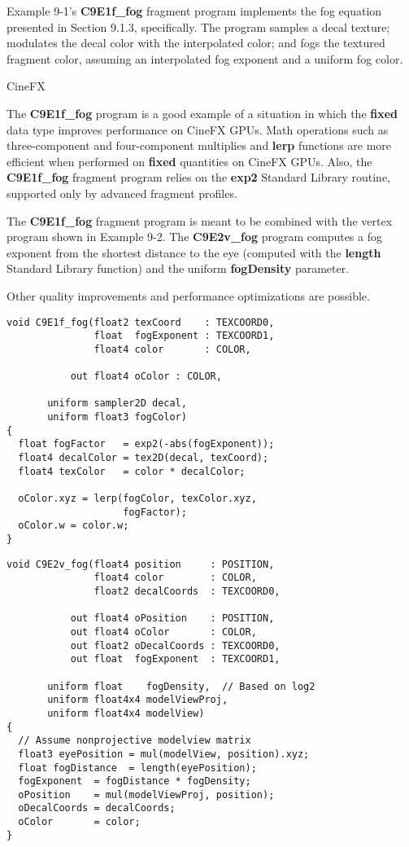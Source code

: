 \documentclass[../main.tex]{subfiles}
\begin{document}
Example 9-1's \textbf{C9E1f_fog} fragment program implements the fog equation presented in Section 9.1.3, specifically. The program samples a decal texture; modulates the decal color with the interpolated color; and fogs the textured fragment color, assuming an interpolated fog exponent and a uniform fog color.

\begin{framed}
CineFX

The \textbf{C9E1f_fog} program is a good example of a situation in which the \textbf{fixed} data type improves performance on CineFX GPUs. Math operations such as three-component and four-component multiplies and \textbf{lerp} functions are more efficient when performed on \textbf{fixed} quantities on CineFX GPUs. Also, the \textbf{C9E1f_fog} fragment program relies on the \textbf{exp2} Standard Library routine, supported only by advanced fragment profiles.
\end{framed}

The \textbf{C9E1f_fog} fragment program is meant to be combined with the vertex program shown in Example 9-2. The \textbf{C9E2v_fog} program computes a fog exponent from the shortest distance to the eye (computed with the \textbf{length} Standard Library function) and the uniform \textbf{fogDensity} parameter.

Other quality improvements and performance optimizations are possible.

\FloatBarrier
\begin{lstlisting}[caption=Example 9-1. The \textbf{C9E1f_fog} Fragment Program]
void C9E1f_fog(float2 texCoord    : TEXCOORD0,
               float  fogExponent : TEXCOORD1,
               float4 color       : COLOR,

           out float4 oColor : COLOR,

       uniform sampler2D decal,
       uniform float3 fogColor)
{
  float fogFactor   = exp2(-abs(fogExponent));
  float4 decalColor = tex2D(decal, texCoord);
  float4 texColor   = color * decalColor;

  oColor.xyz = lerp(fogColor, texColor.xyz,
                    fogFactor);
  oColor.w = color.w;
}
\end{lstlisting}
\FloatBarrier

\FloatBarrier
\begin{lstlisting}[caption=Example 9-2. The \textbf{C9E2v_fog} Vertex Program]
void C9E2v_fog(float4 position     : POSITION,
               float4 color        : COLOR,
               float2 decalCoords  : TEXCOORD0,

           out float4 oPosition    : POSITION,
           out float4 oColor       : COLOR,
           out float2 oDecalCoords : TEXCOORD0,
           out float  fogExponent  : TEXCOORD1,

       uniform float    fogDensity,  // Based on log2
       uniform float4x4 modelViewProj,
       uniform float4x4 modelView)
{
  // Assume nonprojective modelview matrix
  float3 eyePosition = mul(modelView, position).xyz;
  float fogDistance  = length(eyePosition);
  fogExponent  = fogDistance * fogDensity;
  oPosition    = mul(modelViewProj, position);
  oDecalCoords = decalCoords;
  oColor       = color;
}
\end{lstlisting}
\FloatBarrier
\end{document}
